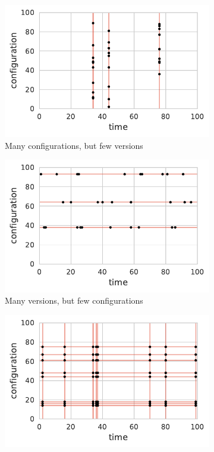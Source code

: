 \documentclass[sigconf]{acmart}
\begin{document}
	\begin{figure}
		\captionsetup{format=hang}
		\begin{subfigure}{0.49\linewidth}
			\includegraphics[width=\linewidth]{images/sampling_1.pdf}
			\caption{Many configurations, but few versions}
			\label{fig:sampling_configurations}
		\end{subfigure}
		\hfill
		\begin{subfigure}{0.49\linewidth}
			\includegraphics[width=\linewidth]{images/sampling_2.pdf}
			\caption{Many versions, but few configurations}
			\label{fig:sampling_versions}
		\end{subfigure}
		\vfill
		\begin{subfigure}{0.49\linewidth}
			\includegraphics[width=\linewidth]{images/sampling_3.pdf}

\end{subfigure}
\end{figure}
\end{document}
